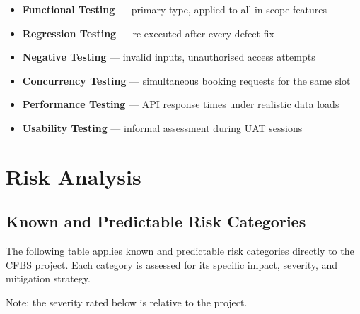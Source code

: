 \documentclass[12pt, a4paper]{article}
\begin{document}
\begin{itemize}[noitemsep]
  \item \textbf{Functional Testing} --- primary type, applied to all in-scope features
  \item \textbf{Regression Testing} --- re-executed after every defect fix
  \item \textbf{Negative Testing} --- invalid inputs, unauthorised access attempts
  \item \textbf{Concurrency Testing} --- simultaneous booking requests for the same slot
  \item \textbf{Performance Testing} --- API response times under realistic data loads
  \item \textbf{Usability Testing} --- informal assessment during UAT sessions
\end{itemize}

\newpage
\section{Risk Analysis}

\subsection{Known and Predictable Risk Categories}

The following table applies known and predictable risk categories directly to the CFBS project. Each category is assessed for its specific impact, severity, and mitigation strategy.

Note: the severity rated below is relative to the project.
\end{document}
